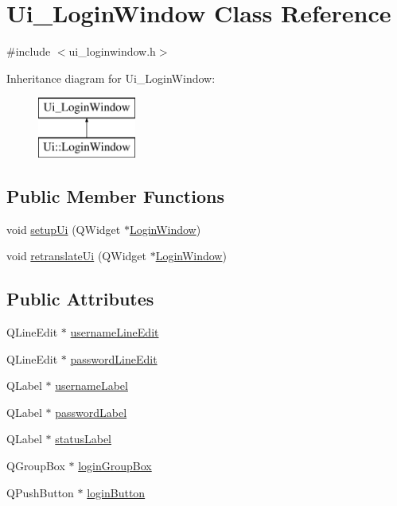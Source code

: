 \hypertarget{class_ui___login_window}{}\section{Ui\+\_\+\+Login\+Window Class Reference}
\label{class_ui___login_window}


{\ttfamily \#include $<$ui\+\_\+loginwindow.\+h$>$}

Inheritance diagram for Ui\+\_\+\+Login\+Window\+:\begin{figure}[H]
\begin{center}
\leavevmode
\includegraphics[height=2.000000cm]{class_ui___login_window}
\end{center}
\end{figure}
\subsection*{Public Member Functions}
\begin{DoxyCompactItemize}
\item 
void \mbox{\hyperlink{class_ui___login_window_a1c3ffc6b9784b68654c59db923f3c217}{setup\+Ui}} (Q\+Widget $\ast$\mbox{\hyperlink{class_login_window}{Login\+Window}})
\item 
void \mbox{\hyperlink{class_ui___login_window_a5f6832fbf9554aef841da1efc1b0fa84}{retranslate\+Ui}} (Q\+Widget $\ast$\mbox{\hyperlink{class_login_window}{Login\+Window}})
\end{DoxyCompactItemize}
\subsection*{Public Attributes}
\begin{DoxyCompactItemize}
\item 
Q\+Line\+Edit $\ast$ \mbox{\hyperlink{class_ui___login_window_a5f0e5d18fc9c536647aed75348b1305f}{username\+Line\+Edit}}
\item 
Q\+Line\+Edit $\ast$ \mbox{\hyperlink{class_ui___login_window_a7ca08bc4b2faa0481c83d588baba7a43}{password\+Line\+Edit}}
\item 
Q\+Label $\ast$ \mbox{\hyperlink{class_ui___login_window_a9595f2c0be7d47ee8d3de1b795d6946d}{username\+Label}}
\item 
Q\+Label $\ast$ \mbox{\hyperlink{class_ui___login_window_ac7e65686283e30b9bbb24dfe6c9d7123}{password\+Label}}
\item 
Q\+Label $\ast$ \mbox{\hyperlink{class_ui___login_window_abdb557fde6663074faa84b449bb2eddc}{status\+Label}}
\item 
Q\+Group\+Box $\ast$ \mbox{\hyperlink{class_ui___login_window_a68ed6094e9a155151988d3063fda01b9}{login\+Group\+Box}}
\item 
Q\+Push\+Button $\ast$ \mbox{\hyperlink{class_ui___login_window_a09edcb5fc16a3ebe02caa58c805881ce}{login\+Button}}
\end{DoxyCompactItemize}


